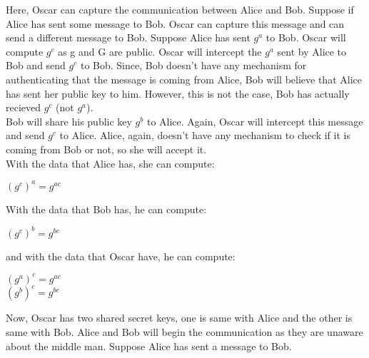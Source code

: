 \documentclass[11pt]{article}
\begin{document}
Here, Oscar can capture the communication between Alice and Bob. Suppose if Alice has sent some message to Bob. Oscar can capture this message and can send a different message to Bob. Suppose Alice has sent $g^a$ to Bob. Oscar will compute $g^c$ as g and G are public. Oscar will intercept the $g^a$ sent by Alice to Bob and send $g^c$ to Bob. Since, Bob doesn't have any mechanism for authenticating that the message is coming from Alice, Bob will believe that Alice has sent her public key to him. However, this is not the case, Bob has actually recieved $g^c$ (not $g^a$).\\
Bob will share his public key $g^b$ to Alice. Again, Oscar will intercept this message and send $g^c$ to Alice. Alice, again, doesn't have any mechanism to check if it is coming from Bob or not, so she will accept it.\\
With the data that Alice has, she can compute:
\begin{center}
    ${(g^c)}^a = g^{ac}$
\end{center}
With the data that Bob has, he can compute:
\begin{center}
    ${(g^c)}^b = g^{bc}$
\end{center}
and with the data that Oscar have, he can compute:
\begin{center}
    ${(g^a)}^c = g^{ac}$ \\ 
    ${(g^b)}^c = g^{bc}$
\end{center}
Now, Oscar has two shared secret keys, one is same with Alice and the other is same with Bob. Alice and Bob will begin the communication as they are unaware about the middle man. Suppose Alice has sent a message to Bob.
\end{document}
